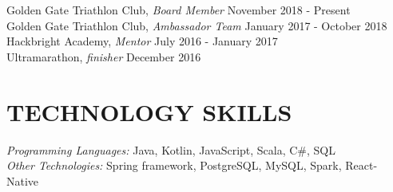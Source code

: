 \documentclass[overlapped, 10pt]{res} %
\begin{document}
\begin{resume}
Golden Gate Triathlon Club, {\sl Board Member} \hfill November 2018 - Present\\
Golden Gate Triathlon Club, {\sl Ambassador Team} \hfill January 2017 - October 2018\\
Hackbright Academy, {\sl Mentor} \hfill July 2016 - January 2017\\
Ultramarathon, {\sl finisher} \hfill December 2016 \\


\section{TECHNOLOGY SKILLS}\smallskip

{\sl Programming Languages:} Java, Kotlin, JavaScript, Scala, C\#, SQL \\
{\sl Other Technologies:} Spring framework, PostgreSQL, MySQL, Spark, React-Native \\
 

\end{resume}
\end{document}
